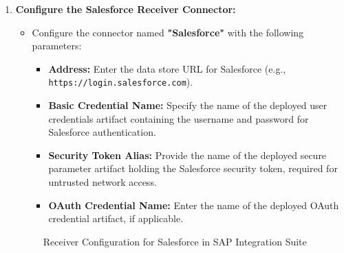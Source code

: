 \begin{enumerate}
\begin{figure}[H]
    \end{figure}

    \item \textbf{Configure the Salesforce Receiver Connector:}
    \begin{itemize}
        \item Configure the connector named \textbf{"Salesforce"} with the following parameters:
        \begin{itemize}
            \item \textbf{Address:} Enter the data store URL for Salesforce (e.g., \texttt{https://login.salesforce.com}).
            \item \textbf{Basic Credential Name:} Specify the name of the deployed user credentials artifact containing the username and password for Salesforce authentication.
            \item \textbf{Security Token Alias:} Provide the name of the deployed secure parameter artifact holding the Salesforce security token, required for untrusted network access.
            \item \textbf{OAuth Credential Name:} Enter the name of the deployed OAuth credential artifact, if applicable.
        \end{itemize}
    \end{itemize}

    \begin{figure}[H]
    \centering
    \caption{Receiver Configuration for Salesforce in SAP Integration Suite}
    
    \end{figure}


\end{enumerate}
